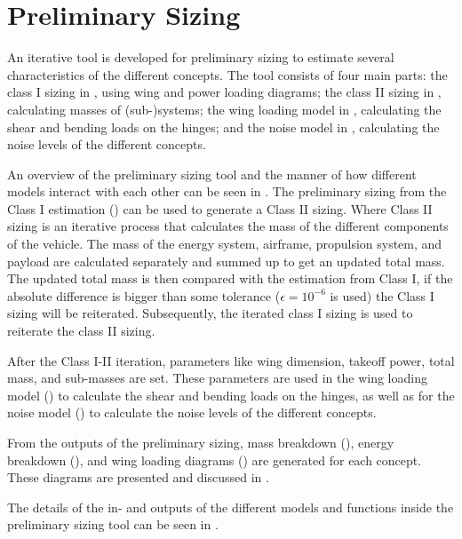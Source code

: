 \chapter{Preliminary Sizing}
\label{ch:PrelimSizing}
An iterative tool is developed for preliminary sizing to estimate several characteristics of the different concepts.
The tool consists of four main parts: the class I sizing in , using wing and power loading diagrams; the class II sizing in , calculating masses of (sub-)systems; the wing loading model in , calculating the shear and bending loads on the hinges; and the noise model in , calculating the noise levels of the different concepts.

An overview of the preliminary sizing tool and the manner of how different models interact with each other can be seen in .
The preliminary sizing from the Class I estimation () can be used to generate a Class II sizing.
Where Class II sizing is an iterative process that calculates the mass of the different components of the vehicle.
The mass of the energy system, airframe, propulsion system, and payload are calculated separately and summed up to get an updated total mass.
The updated total mass is then compared with the estimation from Class I, if the absolute difference is bigger than some tolerance ($\epsilon=10^{-6}$ is used) the Class I sizing will be reiterated.
Subsequently, the iterated class I sizing is used to reiterate the class II sizing.

After the Class I-II iteration, parameters like wing dimension, takeoff power, total mass, and sub-masses are set.
These parameters are used in the wing loading model () to calculate the shear and bending loads on the hinges, as well as for the noise model () to calculate the noise levels of the different concepts.

From the outputs of the preliminary sizing, mass breakdown (), energy breakdown (), and wing loading diagrams () are generated for each concept.
These diagrams are presented and discussed in .

The details of the in- and outputs of the different models and functions inside the preliminary sizing tool can be seen in . %

